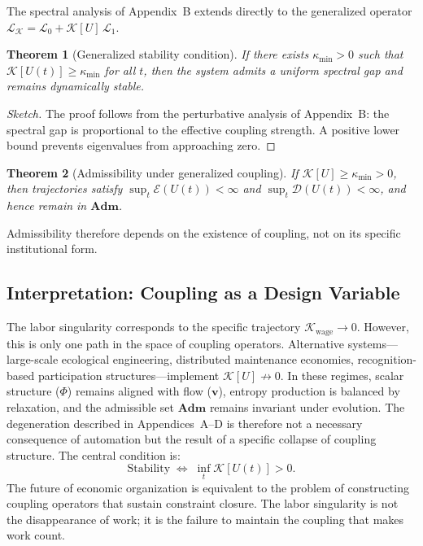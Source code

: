 \documentclass[11pt, a4paper]{article}
\theoremstyle{plain}
\newtheorem{theorem}{Theorem}[section]
\theoremstyle{definition}
\newcommand{\Phifield}{\Phi}
\newcommand{\vfield}{\mathbf{v}}
\newcommand{\Adm}{\mathbf{Adm}}
\begin{document}
The spectral analysis of Appendix~B extends directly to the generalized operator
$\mathcal{L}_{\mathcal{K}} = \mathcal{L}_0 + \mathcal{K}[U]\, \mathcal{L}_1$.

\begin{theorem}[Generalized stability condition]
If there exists $\kappa_{\min} > 0$ such that $\mathcal{K}[U(t)] \geq \kappa_{\min}$
for all $t$, then the system admits a uniform spectral gap and remains dynamically stable.
\end{theorem}

\begin{proof}[Sketch]
The proof follows from the perturbative analysis of Appendix~B: the spectral
gap is proportional to the effective coupling strength. A positive lower bound
prevents eigenvalues from approaching zero.
\end{proof}

\begin{theorem}[Admissibility under generalized coupling]
If $\mathcal{K}[U] \geq \kappa_{\min} > 0$, then trajectories satisfy
$\sup_t \mathcal{E}(U(t)) < \infty$ and $\sup_t \mathcal{D}(U(t)) < \infty$,
and hence remain in $\Adm$.
\end{theorem}

Admissibility therefore depends on the existence of coupling, not on its
specific institutional form.

\subsection{Interpretation: Coupling as a Design Variable}

The labor singularity corresponds to the specific trajectory
$\mathcal{K}_{\mathrm{wage}} \to 0$. However, this is only one path in the
space of coupling operators. Alternative systems---large-scale ecological
engineering, distributed maintenance economies, recognition-based
participation structures---implement $\mathcal{K}[U] \not\to 0$. In these
regimes, scalar structure ($\Phifield$) remains aligned with flow ($\vfield$),
entropy production is balanced by relaxation, and the admissible set $\Adm$
remains invariant under evolution. The degeneration described in
Appendices~A--D is therefore not a necessary consequence of automation but the
result of a specific collapse of coupling structure. The central condition is:
\[
  \text{Stability} \;\Longleftrightarrow\;
  \inf_t \mathcal{K}[U(t)] > 0.
\]
The future of economic organization is equivalent to the problem of constructing
coupling operators that sustain constraint closure. The labor singularity is not
the disappearance of work; it is the failure to maintain the coupling that makes
work count.
\end{document}
